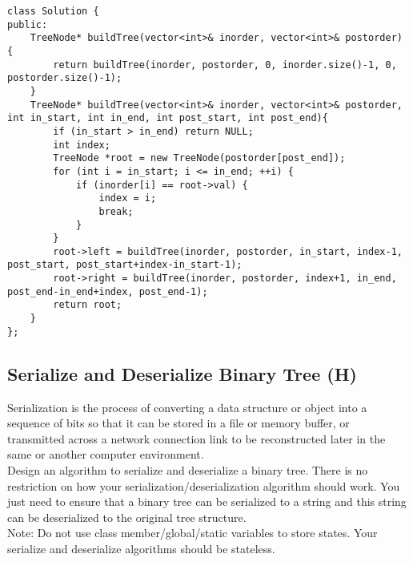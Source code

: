 \begin{lstlisting}
class Solution {
public:
    TreeNode* buildTree(vector<int>& inorder, vector<int>& postorder) {
        return buildTree(inorder, postorder, 0, inorder.size()-1, 0, postorder.size()-1);
    }
    TreeNode* buildTree(vector<int>& inorder, vector<int>& postorder, int in_start, int in_end, int post_start, int post_end){
        if (in_start > in_end) return NULL;
        int index;
        TreeNode *root = new TreeNode(postorder[post_end]);
        for (int i = in_start; i <= in_end; ++i) {
            if (inorder[i] == root->val) {
                index = i;
                break;
            }
        }
        root->left = buildTree(inorder, postorder, in_start, index-1, post_start, post_start+index-in_start-1);
        root->right = buildTree(inorder, postorder, index+1, in_end, post_end-in_end+index, post_end-1);
        return root;
    }
};
\end{lstlisting}


\subsection{Serialize and Deserialize Binary Tree (H)}
Serialization is the process of converting a data structure or object into a sequence of bits so that it can be stored in a file or memory buffer, or transmitted across a network connection link to be reconstructed later in the same or another computer environment.\\

Design an algorithm to serialize and deserialize a binary tree. There is no restriction on how your serialization/deserialization algorithm should work. You just need to ensure that a binary tree can be serialized to a string and this string can be deserialized to the original tree structure.\\

Note: Do not use class member/global/static variables to store states. Your serialize and deserialize algorithms should be stateless. \\

